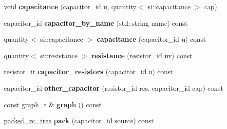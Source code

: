 \begin{DoxyCompactItemize}
\item 
\hypertarget{classophidian_1_1interconnection_1_1rc__tree_a4db2106df9ff03422a9efa996d9dabfe}{void {\bfseries capacitance} (capacitor\-\_\-id u, quantity$<$ si\-::capacitance $>$ cap)}\label{classophidian_1_1interconnection_1_1rc__tree_a4db2106df9ff03422a9efa996d9dabfe}

\item 
\hypertarget{classophidian_1_1interconnection_1_1rc__tree_a27d52641b61ecb5722f5c9f7e183f674}{capacitor\-\_\-id {\bfseries capacitor\-\_\-by\-\_\-name} (std\-::string name) const }\label{classophidian_1_1interconnection_1_1rc__tree_a27d52641b61ecb5722f5c9f7e183f674}

\item 
\hypertarget{classophidian_1_1interconnection_1_1rc__tree_a4b3aad5a72af43566289e6de214ace50}{quantity$<$ si\-::capacitance $>$ {\bfseries capacitance} (capacitor\-\_\-id u) const }\label{classophidian_1_1interconnection_1_1rc__tree_a4b3aad5a72af43566289e6de214ace50}

\item 
\hypertarget{classophidian_1_1interconnection_1_1rc__tree_a15276013af4bb7283f62656531ffecfb}{quantity$<$ si\-::resistance $>$ {\bfseries resistance} (resistor\-\_\-id uv) const }\label{classophidian_1_1interconnection_1_1rc__tree_a15276013af4bb7283f62656531ffecfb}

\item 
\hypertarget{classophidian_1_1interconnection_1_1rc__tree_a1c296a5067234cb99ce6a8ca1f085c75}{resistor\-\_\-it {\bfseries capacitor\-\_\-resistors} (capacitor\-\_\-id u) const }\label{classophidian_1_1interconnection_1_1rc__tree_a1c296a5067234cb99ce6a8ca1f085c75}

\item 
\hypertarget{classophidian_1_1interconnection_1_1rc__tree_a612ffed536ea1fbaf6e7574f4e0a6531}{capacitor\-\_\-id {\bfseries other\-\_\-capacitor} (resistor\-\_\-id res, capacitor\-\_\-id cap) const }\label{classophidian_1_1interconnection_1_1rc__tree_a612ffed536ea1fbaf6e7574f4e0a6531}

\item 
\hypertarget{classophidian_1_1interconnection_1_1rc__tree_a52102a355b292bca74f6494663c477e8}{const graph\-\_\-t \& {\bfseries graph} () const }\label{classophidian_1_1interconnection_1_1rc__tree_a52102a355b292bca74f6494663c477e8}

\item 
\hypertarget{classophidian_1_1interconnection_1_1rc__tree_a0a852fd1963a93694f0bebdc24eee69a}{\hyperlink{classophidian_1_1interconnection_1_1packed__rc__tree}{packed\-\_\-rc\-\_\-tree} {\bfseries pack} (capacitor\-\_\-id source) const }\label{classophidian_1_1interconnection_1_1rc__tree_a0a852fd1963a93694f0bebdc24eee69a}

\end{DoxyCompactItemize}

